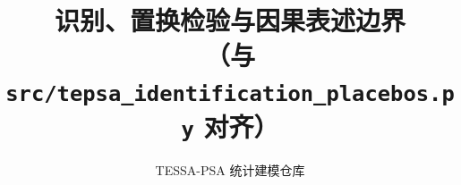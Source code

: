 \documentclass[UTF8,a4paper,zihao=-4]{ctexart}
\begin{document}
\title{识别、置换检验与因果表述边界\\{\normalsize\rmfamily （与 \texttt{src/tepsa\_identification\_placebos.py} 对齐）}}
\author{TESSA-PSA 统计建模仓库}
\date{}
\maketitle


\end{document}
